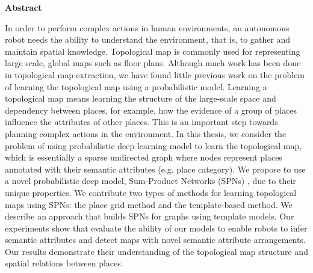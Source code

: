 \documentclass[10pt, titlepage]{article}
\author{Kaiyu Zheng}
\date{April 2017}
\theoremstyle{definition}
\begin{document}


\newpage

\newpage
{} %
\begin{center}\Large \textbf{Abstract}\normalsize\end{center}
In order to perform complex actions in human environments, an autonomous robot needs the ability to understand the environment, that is, to gather and maintain spatial knowledge. Topological map is commonly used for representing large scale, global maps such as floor plans. Although much work has been done in topological map extraction, we have found little previous work on the problem of learning the topological map using a probabilistic model. Learning a topological map means learning the structure of the large-scale space and dependency between places, for example, how the evidence of a group of places influence the attributes of other places. This is an important step towards planning complex actions in the environment. In this thesis, we consider the problem of using probabilistic deep learning model to learn the topological map, which is essentially a sparse undirected graph where nodes represent places annotated with their semantic attributes (e.g. place category). We propose to use a novel probabilistic deep model, Sum-Product Networks (SPNs) \cite{poon2011sum}, due to their unique properties. We contribute two types of methods for learning topological maps using SPNs: the place grid method and the template-based method. We describe an approach that builds SPNs for graphs using template models. Our experiments show that evaluate the ability of our models to enable robots to infer semantic attributes and detect maps with novel semantic attribute arrangements. Our results demonstrate their understanding of the topological map structure and spatial relations between places. 


\newpage
\tableofcontents
 
\newpage
{} %
\end{document}
